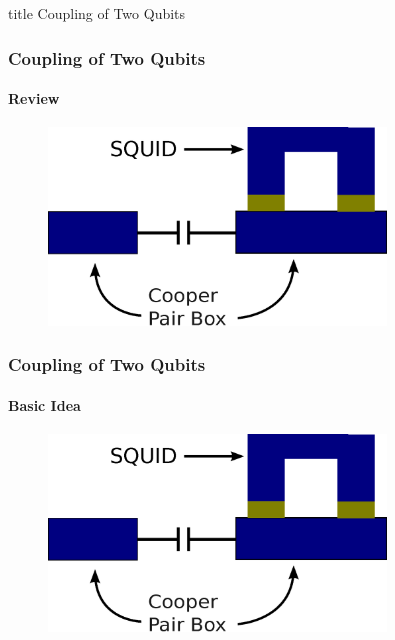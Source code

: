 \documentclass{beamer}
\begin{document}

\begin{frame}
    \vfill
    \centering
    \begin{beamercolorbox}[sep=8pt,center,shadow=true,rounded=true]{title}
        Coupling of Two Qubits
    \end{beamercolorbox}
    \vfill
\end{frame}


\begin{frame}
    \frametitle{Coupling of Two Qubits}
    \framesubtitle{Review}
    \begin{figure}[!htb]
        \centering
        \includegraphics[width=0.8\textwidth]{img/basic-structure.eps}
    \end{figure}
\end{frame}


\begin{frame}
    \frametitle{Coupling of Two Qubits}
    \framesubtitle{Basic Idea}
    \begin{figure}[!htb]
        \centering
        \includegraphics[width=0.8\textwidth]{img/basic-structure.eps}
    \end{figure}
\end{frame}
\end{document}
